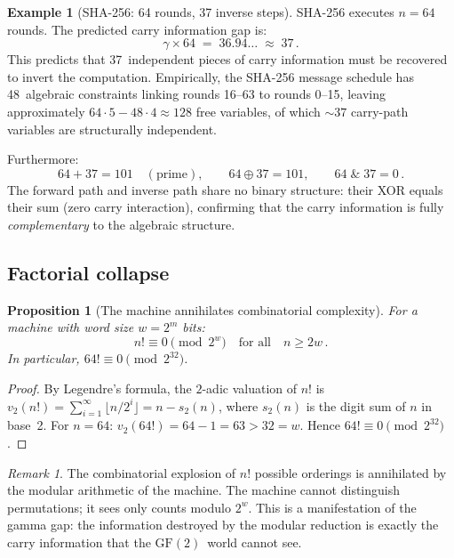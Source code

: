 \documentclass[12pt, a4paper]{article}
\theoremstyle{plain}
\newtheorem{proposition}[theorem]{Proposition}
\theoremstyle{definition}
\newtheorem{example}[theorem]{Example}
\theoremstyle{remark}
\newtheorem{remark}[theorem]{Remark}
\newcommand{\GF}{\mathrm{GF}}
\newcommand{\floor}[1]{\lfloor #1 \rfloor}
\begin{document}
\begin{example}[SHA-256: 64 rounds, 37 inverse steps]
\label{ex:sha}
SHA-256 executes $n = 64$ rounds.  The predicted carry information gap
is:
\[
  \gamma \times 64 \;=\; 36.94\ldots \;\approx\; 37\,.
\]
This predicts that 37~independent pieces of carry information must be
recovered to invert the computation.  Empirically, the SHA-256 message
schedule has 48~algebraic constraints linking rounds 16--63 to rounds
0--15, leaving approximately $64 \cdot 5 - 48 \cdot 4 \approx 128$
free variables, of which $\sim 37$ carry-path variables are
structurally independent.

Furthermore:
\[
  64 + 37 = 101 \quad(\text{prime}), \qquad
  64 \oplus 37 = 101, \qquad
  64 \;\&\; 37 = 0\,.
\]
The forward path and inverse path share no binary structure: their XOR
equals their sum (zero carry interaction), confirming that the
carry information is fully \emph{complementary} to the algebraic
structure.
\end{example}

\subsection{Factorial collapse}

\begin{proposition}[The machine annihilates combinatorial complexity]
\label{prop:factorial}
For a machine with word size $w = 2^m$ bits:
\[
  n! \equiv 0 \pmod{2^w}
  \quad\text{for all}\quad
  n \geq 2w\,.
\]
In particular, $64! \equiv 0 \pmod{2^{32}}$.
\end{proposition}

\begin{proof}
By Legendre's formula, the $2$-adic valuation of $n!$ is
$v_2(n!) = \sum_{i=1}^{\infty}\floor{n/2^i} = n - s_2(n)$, where
$s_2(n)$ is the digit sum of $n$ in base~2.  For $n = 64$:
$v_2(64!) = 64 - 1 = 63 > 32 = w$.  Hence
$64! \equiv 0 \pmod{2^{32}}$.
\end{proof}

\begin{remark}
The combinatorial explosion of $n!$ possible orderings is annihilated
by the modular arithmetic of the machine.  The machine cannot
distinguish permutations; it sees only counts modulo $2^w$.  This is a
manifestation of the gamma gap: the information destroyed by the
modular reduction is exactly the carry information that the
$\GF(2)$~world cannot see.
\end{remark}
\end{document}
